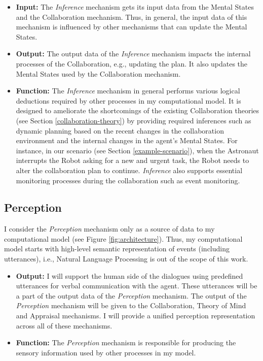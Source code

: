 \documentclass[12pt]{report}
\begin{document}
\begin{itemize}
  \item \textbf{Input:} The \textit{Inference} mechanism gets its input data
  from the Mental States and the Collaboration mechanism. Thus, in general, the
  input data of this mechanism is influenced by other mechanisms that can update
  the Mental States.
  
  \item \textbf{Output:} The output data of the \textit{Inference} mechanism
  impacts the internal processes of the Collaboration, e.g., updating the plan.
  It also updates the Mental States used by the Collaboration mechanism.
  
  \item \textbf{Function:} The \textit{Inference} mechanism in general performs
  various logical deductions required by other processes in my computational
  model. It is designed to ameliorate the shortcomings of the existing
  Collaboration theories (see Section \ref{collaboration-theory}) by providing
  required inferences such as dynamic planning based on the recent changes in
  the collaboration environment and the internal changes in the agent's Mental
  States. For instance, in our scenario (see Section \ref{example-scenario}),
  when the Astronaut interrupts the Robot asking for a new and urgent task, the
  Robot needs to alter the collaboration plan to continue. \textit{Inference}
  also supports essential monitoring processes during the collaboration such as
  event monitoring.
\end{itemize}

\subsection{Perception}

I consider the \textit{Perception} mechanism only as a source of data to my
computational model (see Figure \ref{fig:architecture}). Thus, my computational
model starts with high-level semantic representation of events (including
utterances), i.e., Natural Language Processing is out of the scope of this work.

\begin{itemize}
  \item \textbf{Output:} I will support the human side of the dialogues using
  predefined utterances for verbal communication with the agent. These
  utterances will be a part of the output data of the \textit{Perception}
  mechanism. The output of the \textit{Perception} mechanism will be given to the
  Collaboration, Theory of Mind and Appraisal mechanisms. I will provide a
  unified perception representation across all of these mechanisms.
  
  \item \textbf{Function:} The \textit{Perception} mechanism is responsible for
  producing the sensory information used by other processes in my model.
\end{itemize}
\end{document}
